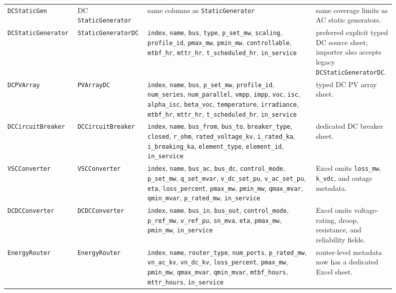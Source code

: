 \begin{longtable}{L{0.15\linewidth}L{0.15\linewidth}L{0.42\linewidth}L{0.18\linewidth}}
\texttt{DCStaticGen} & DC \texttt{StaticGenerator} & same columns as \texttt{StaticGenerator} & same coverage limits as AC static generators. \\
\texttt{DCStaticGenerator} & \texttt{StaticGeneratorDC} & \texttt{index}, \texttt{name}, \texttt{bus}, \texttt{type}, \texttt{p\_set\_mw}, \texttt{scaling}, \texttt{profile\_id}, \texttt{pmax\_mw}, \texttt{pmin\_mw}, \texttt{controllable}, \texttt{mtbf\_hr}, \texttt{mttr\_hr}, \texttt{t\_scheduled\_hr}, \texttt{in\_service} & preferred explicit typed DC source sheet; importer also accepts legacy \texttt{DCStaticGeneratorDC}. \\
\texttt{DCPVArray} & \texttt{PVArrayDC} & \texttt{index}, \texttt{name}, \texttt{bus}, \texttt{p\_set\_mw}, \texttt{profile\_id}, \texttt{num\_series}, \texttt{num\_parallel}, \texttt{vmpp}, \texttt{impp}, \texttt{voc}, \texttt{isc}, \texttt{alpha\_isc}, \texttt{beta\_voc}, \texttt{temperature}, \texttt{irradiance}, \texttt{mtbf\_hr}, \texttt{mttr\_hr}, \texttt{t\_scheduled\_hr}, \texttt{in\_service} & typed DC PV array sheet. \\
\texttt{DCCircuitBreaker} & \texttt{DCCircuitBreaker} & \texttt{index}, \texttt{name}, \texttt{bus\_from}, \texttt{bus\_to}, \texttt{breaker\_type}, \texttt{closed}, \texttt{r\_ohm}, \texttt{rated\_voltage\_kv}, \texttt{i\_rated\_ka}, \texttt{i\_breaking\_ka}, \texttt{element\_type}, \texttt{element\_id}, \texttt{in\_service} & dedicated DC breaker sheet. \\
\texttt{VSCConverter} & \texttt{VSCConverter} & \texttt{index}, \texttt{name}, \texttt{bus\_ac}, \texttt{bus\_dc}, \texttt{control\_mode}, \texttt{p\_set\_mw}, \texttt{q\_set\_mvar}, \texttt{v\_dc\_set\_pu}, \texttt{v\_ac\_set\_pu}, \texttt{eta}, \texttt{loss\_percent}, \texttt{pmax\_mw}, \texttt{pmin\_mw}, \texttt{qmax\_mvar}, \texttt{qmin\_mvar}, \texttt{p\_rated\_mw}, \texttt{in\_service} & Excel omits \texttt{loss\_mw}, \texttt{k\_vdc}, and outage metadata. \\
\texttt{DCDCConverter} & \texttt{DCDCConverter} & \texttt{index}, \texttt{name}, \texttt{bus\_in}, \texttt{bus\_out}, \texttt{control\_mode}, \texttt{p\_ref\_mw}, \texttt{v\_ref\_pu}, \texttt{sn\_mva}, \texttt{eta}, \texttt{pmax\_mw}, \texttt{pmin\_mw}, \texttt{in\_service} & Excel omits voltage-rating, droop, resistance, and reliability fields. \\
\texttt{EnergyRouter} & \texttt{EnergyRouter} & \texttt{index}, \texttt{name}, \texttt{router\_type}, \texttt{num\_ports}, \texttt{p\_rated\_mw}, \texttt{vn\_ac\_kv}, \texttt{vn\_dc\_kv}, \texttt{loss\_percent}, \texttt{pmax\_mw}, \texttt{pmin\_mw}, \texttt{qmax\_mvar}, \texttt{qmin\_mvar}, \texttt{mtbf\_hours}, \texttt{mttr\_hours}, \texttt{in\_service} & router-level metadata now has a dedicated Excel sheet. \\

\end{longtable}
